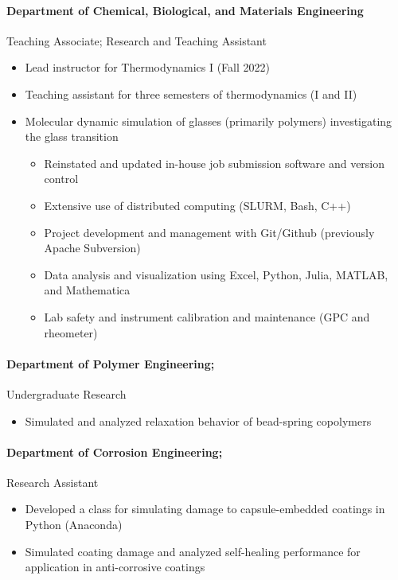 \documentclass{my_cv}
\begin{document}
\paragraph{Department of Chemical, Biological, and Materials Engineering\\}
Teaching Associate; Research and Teaching Assistant
\begin{itemize}
    \item Lead instructor for Thermodynamics I (Fall 2022)
    \item Teaching assistant for three semesters of thermodynamics (I and II)
    \item Molecular dynamic simulation of glasses (primarily polymers) investigating the glass transition
    \begin{itemize}
        \item Reinstated and updated in-house job submission software and version control
        \item Extensive use of distributed computing (SLURM, Bash, C++)
        \item Project development and management with Git/Git\-hub (previously Apache Subversion)
        \item Data analysis and visualization using Excel, Python, Julia, MATLAB, and Math\-e\-ma\-ti\-ca
        \item Lab safety and instrument calibration and maintenance (GPC and rheometer)
    \end{itemize}
\end{itemize}

\paragraph{Department of Polymer Engineering;}
Undergraduate Research
\begin{itemize}
    \item Simulated and analyzed relaxation behavior of bead-spring co\-polymers
\end{itemize}

\paragraph{Department of Corrosion Engineering;}
Research Assistant
\begin{itemize}
    \item Developed a class for simulating damage to capsule-embedded coatings in Python (Anaconda)
    \item Simulated coating damage and analyzed self-healing performance for application in anti-corrosive coatings
\end{itemize}
\end{document}
